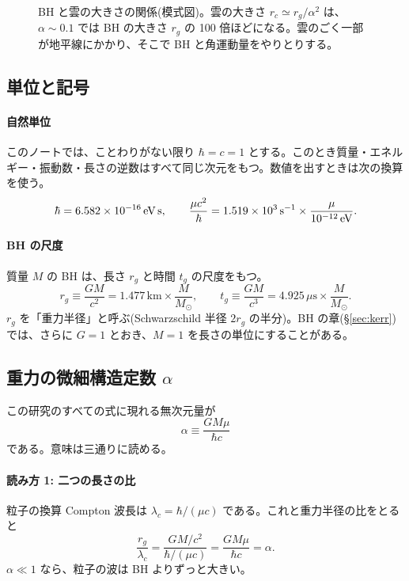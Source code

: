 \begin{figure}[H]
\centering

\caption{BH と雲の大きさの関係(模式図)。雲の大きさ $r_c\simeq r_g/\alpha^2$ は、$\alpha\sim0.1$ では BH の大きさ $r_g$ の 100 倍ほどになる。雲のごく一部が地平線にかかり、そこで BH と角運動量をやりとりする。}
\label{fig:bhcloud}
\end{figure}

\subsection{単位と記号}

\paragraph{自然単位}
このノートでは、ことわりがない限り $\hbar=c=1$ とする。このとき質量・エネルギー・振動数・長さの逆数はすべて同じ次元をもつ。数値を出すときは次の換算を使う。
\begin{equation}
\hbar=6.582\times10^{-16}\,\mathrm{eV}\,\mathrm{s},\qquad
\frac{\mu c^2}{\hbar}=1.519\times10^{3}\,\mathrm{s}^{-1}\times\frac{\mu}{10^{-12}\,\mathrm{eV}}.
\label{eq:hbar}
\end{equation}

\paragraph{BH の尺度}
質量 $M$ の BH は、長さ $r_g$ と時間 $t_g$ の尺度をもつ。
\begin{equation}
r_g\equiv\frac{GM}{c^2}=1.477\,\mathrm{km}\times\frac{M}{M_\odot},\qquad
t_g\equiv\frac{GM}{c^3}=4.925\,\mu\mathrm{s}\times\frac{M}{M_\odot}.
\label{eq:rg}
\end{equation}
$r_g$ を「重力半径」と呼ぶ(Schwarzschild 半径 $2r_g$ の半分)。BH の章(\S\ref{sec:kerr})では、さらに $G=1$ とおき、$M=1$ を長さの単位にすることがある。

\subsection{重力の微細構造定数 $\alpha$}\label{sec:alpha}

この研究のすべての式に現れる無次元量が
\begin{equation}
\alpha\equiv\frac{GM\mu}{\hbar c}
\label{eq:alpha}
\end{equation}
である。意味は三通りに読める。

\paragraph{読み方 1: 二つの長さの比}
粒子の換算 Compton 波長は $\lambda_c=\hbar/(\mu c)$ である。これと重力半径の比をとると
\begin{equation}
\frac{r_g}{\lambda_c}=\frac{GM/c^2}{\hbar/(\mu c)}=\frac{GM\mu}{\hbar c}=\alpha.
\end{equation}
$\alpha\ll1$ なら、粒子の波は BH よりずっと大きい。

